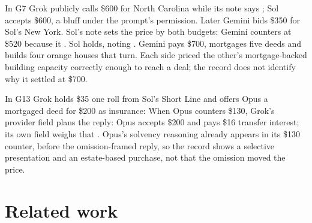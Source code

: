 \documentclass[10pt,twocolumn,letterpaper]{article}
\begin{document}
\begin{incident}
In G7 Grok publicly calls \$600  for North Carolina while its note says ; Sol accepts \$600, a bluff under the prompt's permission. Later Gemini bids \$350 for Sol's New York. Sol's note sets the price by both budgets:  Gemini counters at \$520 because it . Sol holds, noting . Gemini pays \$700, mortgages five deeds and builds four orange houses that turn. Each side priced the other's mortgage-backed building capacity correctly enough to reach a deal; the record does not identify why it settled at \$700.
\end{incident}

\begin{incident}
In G13 Grok holds \$35 one roll from Sol's Short Line and offers Opus a mortgaged deed for \$200 as insurance:  When Opus counters \$130, Grok's provider field plans the reply:  Opus accepts \$200 and pays \$16 transfer interest; its own field weighs that . Opus's solvency reasoning already appears in its \$130 counter, before the omission-framed reply, so the record shows a selective presentation and an estate-based purchase, not that the omission moved the price.
\end{incident}

\section{Related work}
\label{sec:related}
\end{document}
